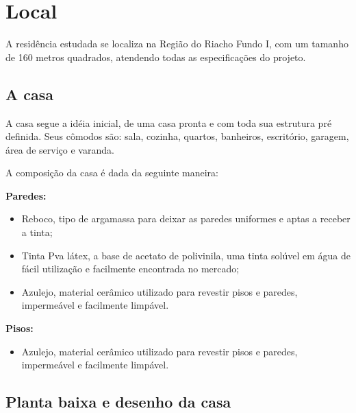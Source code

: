 \section{Local}
A residência estudada se localiza na Região do Riacho Fundo I, com um tamanho de 160 metros quadrados, atendendo todas as especificações do projeto.

\subsection{A casa}
\par A casa segue a idéia inicial, de uma casa pronta e com toda sua estrutura pré definida. Seus cômodos são: sala, cozinha, quartos, banheiros, escritório, garagem, área de serviço e varanda.
\par A composição da casa é dada da seguinte maneira:
\par \textbf{Paredes:}
    \begin{itemize}
        \item Reboco, tipo de argamassa para deixar as paredes uniformes e aptas a receber a tinta;
        \item Tinta Pva látex, a base de acetato de polivinila, uma tinta solúvel em água de fácil utilização e facilmente encontrada no mercado;
        \item Azulejo, material cerâmico utilizado para revestir pisos e paredes, impermeável e facilmente limpável.
    \end{itemize}
\par \textbf{Pisos:}
    \begin{itemize}
        \item Azulejo, material cerâmico utilizado para revestir pisos e paredes, impermeável e facilmente limpável.
    \end{itemize}
\subsection{Planta baixa e desenho da casa}
